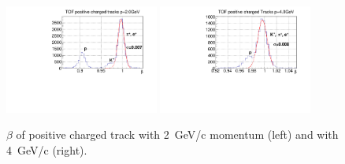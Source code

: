 \begin{figure}[tbp]
\begin{center}
\includegraphics[width=0.45\textwidth]{figures/TOF_postracks_2000mev.pdf}
\includegraphics[width=0.45\textwidth]{figures/TOF_postracks_4000mev.pdf}
\caption{\label{fig:betaproj}$\beta$ of positive charged track with 2~GeV/c momentum (left) and with 4~GeV/c (right).}
\end{center}
\end{figure}
